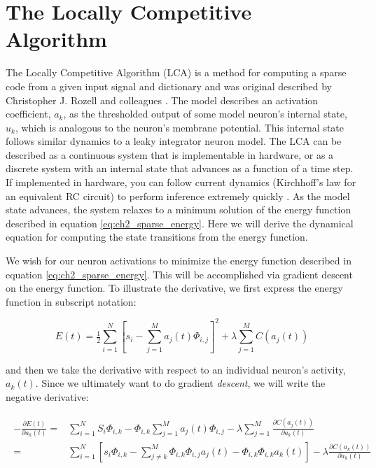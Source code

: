 \section{The Locally Competitive Algorithm}\label{sec:ch2_lca}
The Locally Competitive Algorithm (LCA) is a method for computing a sparse code from a given input signal and dictionary and was original described by Christopher J. Rozell and colleagues \citeyearpar{rozell2008sparse}. The model describes an activation coefficient, $a_{k}$, as the thresholded output of some model neuron's internal state, $u_{k}$, which is analogous to the neuron's membrane potential. This internal state follows similar dynamics to a leaky integrator neuron model. The LCA can be described as a continuous system that is implementable in hardware, or as a discrete system with an internal state that advances as a function of a time step. If implemented in hardware, you can follow current dynamics (Kirchhoff's law for an equivalent RC circuit) to perform inference extremely quickly \parencite{rozell2008sparse}. As the model state advances, the system relaxes to a minimum solution of the energy function described in equation \eqref{eq:ch2_sparse_energy}. Here we will derive the dynamical equation for computing the state transitions from the energy function.

We wish for our neuron activations to minimize the energy function described in equation \eqref{eq:ch2_sparse_energy}. This will be accomplished via gradient descent on the energy function. To illustrate the derivative, we first express the energy function in subscript notation:

\begin{equation}\label{eq:ch2_subscript_sparse_energy_func}
    E(t) = \tfrac{1}{2} \sum\limits_{i=1}^{N} \left[ s_{i} - \sum\limits_{j=1}^{M}a_{j}(t) \Phi_{i,j} \right]^{2} + \lambda \sum\limits_{j=1}^{M} C(a_{j}(t))
\end{equation}

and then we take the derivative with respect to an individual neuron's activity, $a_{k}(t)$. Since we ultimately want to do gradient \textit{descent}, we will write the negative derivative:

\begin{align}\label{eq:ch2_lca_deda_extended}
\begin{split}
    - \frac{\partial E(t)}{\partial a_{k}(t)}
    =
        &\sum\limits_{i=1}^{N} S_{i} \Phi_{i,k} -
        \Phi_{i,k}\sum\limits_{j=1}^{M}a_{j}(t) \Phi_{i,j} -
        \lambda \sum\limits_{j=1}^{M}\frac{\partial C(a_{j}(t))}{\partial a_{k}(t)} \\
    =
        &\sum\limits_{i=1}^{N} \left[ s_{i} \Phi_{i,k} -
        \sum\limits_{j \neq k}^{M} \Phi_{i,k} \Phi_{i,j} a_{j}(t) - \Phi_{i,k}\Phi_{i,k}a_{k}(t) \right] -
        \lambda \frac{\partial C(a_{k}(t))}{\partial a_{k}(t)}
\end{split}
\end{align}

